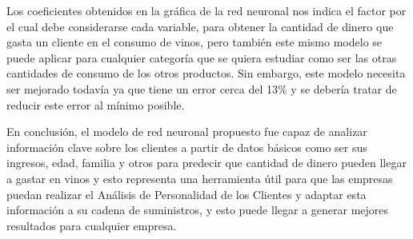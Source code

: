 \documentclass[Iberoamerican Journal of Industrial
Engineering,article,submit,moreauthors,pdftex]{Definitions/mdpi}
\begin{document}
Los coeficientes obtenidos en la gráfica de la red neuronal nos indica
el factor por el cual debe considerarse cada variable, para obtener la
cantidad de dinero que gasta un cliente en el consumo de vinos, pero
también este mismo modelo se puede aplicar para cualquier categoría que
se quiera estudiar como ser las otras cantidades de consumo de los otros
productos. Sin embargo, este modelo necesita ser mejorado todavía ya que
tiene un error cerca del 13\% y se debería tratar de reducir este error
al mínimo posible.

En conclusión, el modelo de red neuronal propuesto fue capaz de analizar
información clave sobre los clientes a partir de datos básicos como ser
sus ingresos, edad, familia y otros para predecir que cantidad de dinero
pueden llegar a gastar en vinos y esto representa una herramienta útil
para que las empresas puedan realizar el Análisis de Personalidad de los
Clientes y adaptar esta información a su cadena de suministros, y esto
puede llegar a generar mejores resultados para cualquier empresa.


\vspace{6pt}












\end{document}
